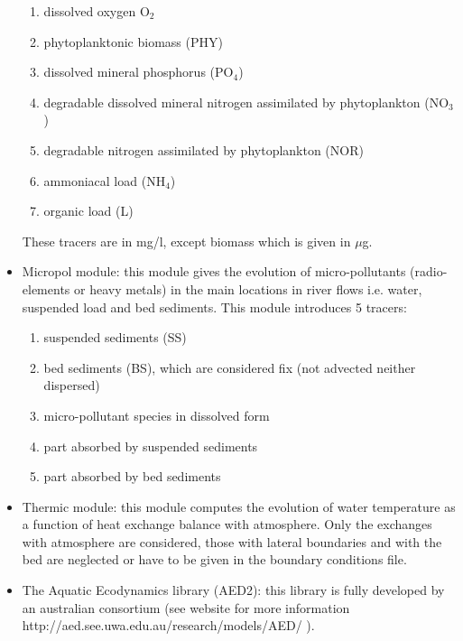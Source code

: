 \begin{itemize}
\begin{enumerate}
\item  dissolved oxygen O${}_{2}$

\item  phytoplanktonic biomass (PHY)

\item  dissolved mineral phosphorus (PO${}_{4}$)

\item  degradable dissolved mineral nitrogen assimilated by phytoplankton (NO${}_{3}$)

\item  degradable nitrogen assimilated by phytoplankton (NOR)

\item  ammoniacal load (NH${}_{4}$)

\item  organic load (L)
\end{enumerate}

     These tracers are in mg/l, except biomass which is given in $\mu$g.

\item  Micropol module:  this module gives the evolution of micro-pollutants (radio-elements or heavy metals) in the main locations in river flows i.e. water, suspended load and bed sediments. This module introduces 5 tracers:
\begin{enumerate}
\item  suspended sediments (SS)

\item  bed sediments (BS), which are considered fix (not advected neither dispersed)

\item  micro-pollutant species in dissolved form

\item  part absorbed by suspended sediments

\item  part absorbed by bed sediments
\end{enumerate}

\item  Thermic module: this module computes the evolution of water temperature as a function of heat exchange balance with atmosphere. Only the exchanges with atmosphere are considered, those with lateral boundaries and with the bed are neglected or have to be given in the boundary conditions file.
\item The Aquatic Ecodynamics library (AED2): this library is fully developed by an australian consortium (see website for more information http://aed.see.uwa.edu.au/research/models/AED/ ).

\end{itemize}
